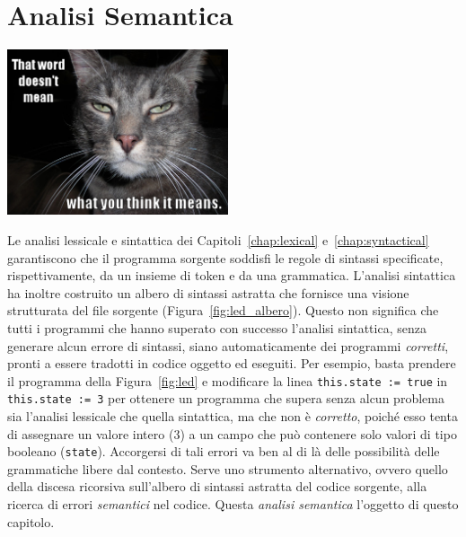 \chapter{Analisi Semantica}\label{chap:semantical}
%
\vspace*{-2ex}
\begin{center}
\includegraphics[width=6.5cm]{ThinkingCat.png}
\end{center}
%
Le analisi lessicale e sintattica dei Capitoli~\ref{chap:lexical}
e~\ref{chap:syntactical} garantiscono che il programma sorgente
soddisfi le regole di sintassi specificate, rispettivamente,
da un insieme di token e da una grammatica. L'analisi sintattica
ha inoltre costruito un albero di sintassi astratta che fornisce una visione
strutturata del file sorgente (Figura~\ref{fig:led_albero}).
Questo non significa che tutti i programmi che hanno superato con successo
l'analisi sintattica, \cioe senza generare alcun errore di sintassi,
siano automaticamente dei programmi \emph{corretti}, pronti a essere tradotti
in codice oggetto ed eseguiti. Per esempio, basta prendere il programma
della Figura~\ref{fig:led} e modificare la linea \texttt{this.state := true}
in \texttt{this.state := 3} per ottenere un programma che supera senza alcun
problema sia l'analisi lessicale che quella sintattica, ma che non \`e
\emph{corretto}, poich\'e esso tenta di assegnare un valore intero
($3$) a un campo che pu\`o contenere solo valori di tipo
booleano (\texttt{state}). Accorgersi di tali errori va ben al di l\`a delle
possibilit\`a delle grammatiche libere dal contesto. Serve uno strumento
alternativo, ovvero quello della discesa ricorsiva sull'albero di sintassi
astratta del codice sorgente, alla ricerca di errori \emph{semantici}
nel codice. Questa \emph{analisi semantica} \e l'oggetto di questo capitolo.

